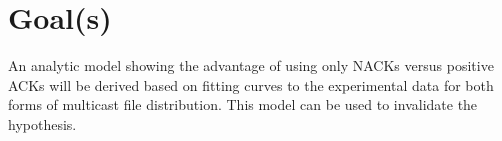 \section{Goal(s)}
\label{sect:goals}

An analytic model showing the advantage of using only \glspl{NACK} versus positive \glspl{ACK} will be derived based on fitting curves to the experimental data for both forms of multicast file distribution. This model can be used to invalidate the hypothesis.
